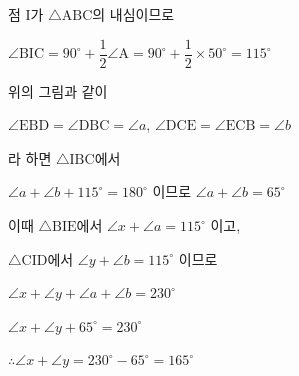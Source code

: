 점 $\mathrm{I}$가 $\triangle\mathrm{ABC}$의 내심이므로

$\angle\mathrm{BIC} = 90^\circ + \dfrac{1}{2}\angle\mathrm{A} = 90^\circ + \dfrac{1}{2}\times 50^\circ = 115^\circ$

위의 그림과 같이

$\angle\mathrm{EBD} = \angle\mathrm{DBC} = \angle a$, $\angle\mathrm{DCE} = \angle\mathrm{ECB} = \angle b$

라 하면 $\triangle\mathrm{IBC}$에서

$\angle a + \angle b + 115^\circ = 180^\circ$ 이므로 $\angle a + \angle b = 65^\circ$

이때 $\triangle\mathrm{BIE}$에서 $\angle x + \angle a = 115^\circ$ 이고,

$\triangle\mathrm{CID}$에서 $\angle y + \angle b = 115^\circ$ 이므로

$\angle x + \angle y + \angle a + \angle b = 230^\circ$

$\angle x + \angle y + 65^\circ = 230^\circ$

$\therefore \angle x + \angle y = 230^\circ - 65^\circ = 165^\circ$
